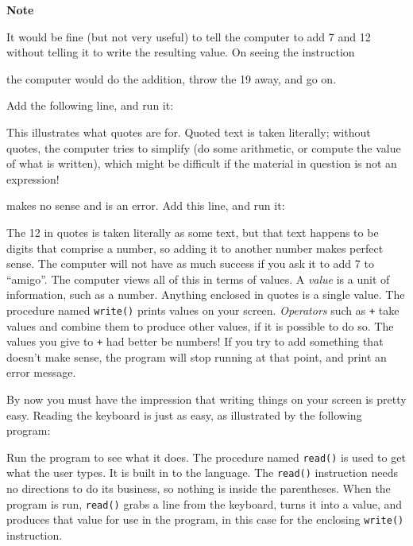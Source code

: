 {\sffamily\bfseries
Note}

{\sffamily
It would be fine (but not very useful) to tell the computer to add 7 and
12 without telling it to write the resulting value. On seeing the
instruction}


\noindent
the computer would do the addition, throw the 19 away, and go on.

Add the following line, and run it:


This illustrates what quotes are for. Quoted text is taken
literally; without quotes, the computer tries to simplify (do
some arithmetic, or compute the value of what is written), which might
be difficult if the material in question is not an expression!


\noindent makes no sense and is an error. Add this line, and run it:


The 12 in quotes is taken literally as some text, but that text happens
to be digits that comprise a number, so adding it to another number
makes perfect sense. The computer will not have as much success if you
ask it to add 7 to {\textquotedblleft}amigo{\textquotedblright}. The
computer views all of this in terms of values. A \textit{value} is a
unit of information, such as a number. Anything enclosed in quotes is a
single value. The procedure named \texttt{write()}
prints values on your screen. \textit{Operators} such as \texttt{+}
take values and combine them to produce other values, if it is possible
to do so. The values you give to \texttt{+} had better be numbers! If
you try to add something that doesn't make sense, the
program will stop running at that point, and print an error message.

By now you must have the impression that writing things on your screen
is pretty easy. Reading the keyboard is just as easy,
as illustrated by the following program:


Run the program to see what it does. The procedure named
\texttt{read()} is used to get what the user types. It is
built in to the language. The \texttt{read()} instruction needs no
directions to do its business, so nothing is inside the parentheses.
When the program is run, \texttt{read()} grabs a line from the
keyboard, turns it into a value, and produces that value for use in the
program, in this case for the enclosing \texttt{write()} instruction.

